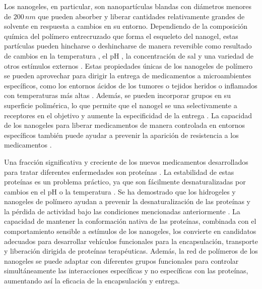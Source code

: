 Los nanogeles, en particular, son nanopart\'iculas blandas con di\'ametros menores de $200\,nm$  que pueden absorber y liberar cantidades relativamente grandes de solvente en respuesta a cambios en su entorno.
Dependiendo de la composici\'on qu\'imica del pol\'imero entrecruzado que forma el esqueleto del nanogel, estas part\'iculas pueden hincharse o deshincharse de manera reversible como resultado de cambios en la temperatura \cite{agnihotri2021temperature}, el pH \cite{sharma2022modulating}, la concentraci\'on de sal \cite{saraydin2022calculations} y una variedad de otros est\'imulos externos \cite{jung2020responsive,plamper2017functional, yang2022co}.
Estas propiedades \'unicas de los nanogeles de pol\'imero se pueden aprovechar para dirigir la entrega de medicamentos a microambientes espec\'ificos, como los entornos \'acidos de los tumores \cite{zhang2020construction} o tejidos heridos o inflamados con temperaturas m\'as altas \cite{wu2010core}.
Adem\'as, se pueden incorporar grupos en su superficie polim\'erica, lo que permite que el nanogel se una selectivamente a receptores en el objetivo y aumente la especificidad de la entrega \cite{ahadian2020micro, mukherjee2019lipid, torchilin2007micellar, farokhzad2006targeted}.
La capacidad de los nanogeles para liberar medicamentos de manera controlada en entornos espec\'ificos tambi\'en puede ayudar a prevenir la aparici\'on de resistencia a los medicamentos \cite{mukherjee2019lipid}.


Una fracci\'on significativa y creciente de los nuevos medicamentos desarrollados para tratar diferentes enfermedades son prote\'inas \cite{mahmood2023recent}.
La estabilidad de estas prote\'inas es un problema pr\'actico, ya que son f\'acilmente desnaturalizadas por cambios en el pH o la temperatura \cite{frokjaer2005protein}.
Se ha demostrado que los hidrogeles y nanogeles de pol\'imero ayudan a prevenir la desnaturalizaci\'on de las prote\'inas y la p\'erdida de actividad bajo las condiciones mencionadas anteriormente \cite{macdougall2021charged, peppas2004hydrogels}.
La capacidad de mantener la conformaci\'on nativa de las prote\'inas, combinada con el comportamiento sensible a est\'imulos de los nanogeles, los convierte en candidatos adecuados para desarrollar veh\'iculos funcionales para la encapsulaci\'on, transporte y liberaci\'on dirigida de prote\'inas terap\'euticas.
Adem\'as, la red de pol\'imeros de los nanogeles se puede adaptar con diferentes grupos funcionales para controlar simult\'aneamente las interacciones espec\'ificas y no espec\'ificas con las prote\'inas, aumentando as\'i la eficacia de la encapsulaci\'on y entrega.

